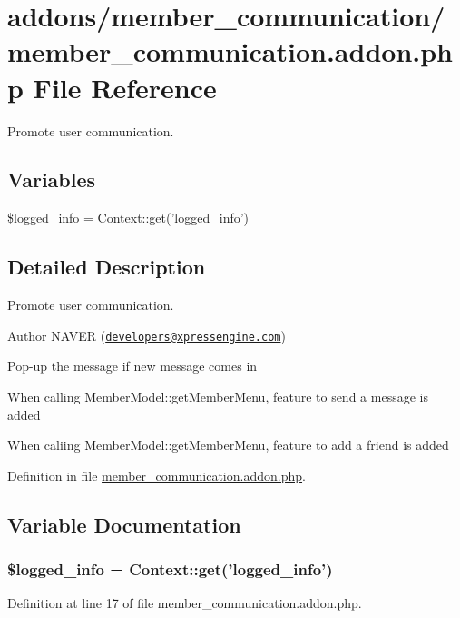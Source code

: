 \hypertarget{member__communication_8addon_8php}{\section{addons/member\+\_\+communication/member\+\_\+communication.addon.\+php File Reference}
\label{member__communication_8addon_8php}
}


Promote user communication.  


\subsection*{Variables}
\begin{DoxyCompactItemize}
\item 
\hyperlink{member__communication_8addon_8php_a193c1593ceb216e9fb05b0bad01ebbc8}{\$logged\+\_\+info} = \hyperlink{classContext_a90ce25d65fe6c9778421cbb36ab3def5}{Context\+::get}('logged\+\_\+info')
\end{DoxyCompactItemize}


\subsection{Detailed Description}
Promote user communication. 

\begin{DoxyAuthor}{Author}
N\+A\+V\+E\+R (\href{mailto:developers@xpressengine.com}{\tt developers@xpressengine.\+com})
\begin{DoxyItemize}
\item Pop-\/up the message if new message comes in
\item When calling Member\+Model\+::get\+Member\+Menu, feature to send a message is added
\item When caliing Member\+Model\+::get\+Member\+Menu, feature to add a friend is added 
\end{DoxyItemize}
\end{DoxyAuthor}


Definition in file \hyperlink{member__communication_8addon_8php_source}{member\+\_\+communication.\+addon.\+php}.



\subsection{Variable Documentation}
\hypertarget{member__communication_8addon_8php_a193c1593ceb216e9fb05b0bad01ebbc8}{
\subsubsection[{\$logged\+\_\+info}]{\setlength{\rightskip}{0pt plus 5cm}\$logged\+\_\+info = {\bf Context\+::get}('logged\+\_\+info')}}\label{member__communication_8addon_8php_a193c1593ceb216e9fb05b0bad01ebbc8}


Definition at line 17 of file member\+\_\+communication.\+addon.\+php.

